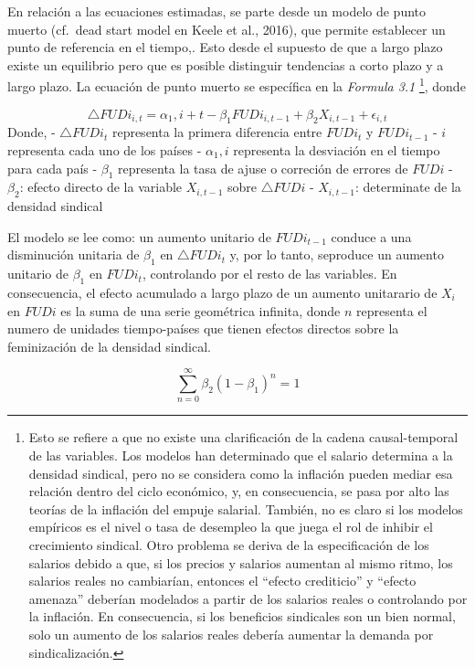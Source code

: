 \documentclass[
]{book}
\begin{document}
En relación a las ecuaciones estimadas, se parte desde un modelo de punto muerto (cf.~dead start model en Keele et al., 2016), que permite establecer un punto de referencia en el tiempo,. Esto desde el supuesto de que a largo plazo existe un equilibrio pero que es posible distinguir tendencias a corto plazo y a largo plazo. La ecuación de punto muerto se específica en la \emph{Formula 3.1} \footnote{Esto se refiere a que no existe una clarificación de la cadena causal-temporal de las variables. Los modelos han determinado que el salario determina a la densidad sindical, pero no se considera como la inflación pueden mediar esa relación dentro del ciclo económico, y, en consecuencia, se pasa por alto las teorías de la inflación del empuje salarial. También, no es claro si los modelos empíricos es el nivel o tasa de desempleo la que juega el rol de inhibir el crecimiento sindical. Otro problema se deriva de la especificación de los salarios debido a que, si los precios y salarios aumentan al mismo ritmo, los salarios reales no cambiarían, entonces el ``efecto crediticio'' y ``efecto amenaza'' deberían modelados a partir de los salarios reales o controlando por la inflación. En consecuencia, si los beneficios sindicales son un bien normal, solo un aumento de los salarios reales debería aumentar la demanda por sindicalización.}, donde

\[\triangle FUDi_{i,t} = \alpha_1,i + t- \beta_1FUDi_{i,t-1}+ \beta_2X_{i,t-1}+ \epsilon_{i,t}\]
Donde,
- \(\triangle FUDi_{t}\) representa la primera diferencia entre \(FUDi_{t}\) y \(FUDi_{t-1}\)
- \(i\) representa cada uno de los países
- \(\alpha_1,i\) representa la desviación en el tiempo para cada país
- \(\beta_1\) representa la tasa de ajuse o correción de errores de \(FUDi\)
- \(\beta_2\): efecto directo de la variable \(X_{i,t-1}\) sobre \(\triangle FUDi\)
- \(X_{i,t-1}\): determinate de la densidad sindical

El modelo se lee como: un aumento unitario de \(FUDi_{t-1}\) conduce a una disminución unitaria de \(\beta_1\) en \(\triangle FUDi_{t}\) y, por lo tanto, seproduce un aumento unitario de \(\beta_1\) en \(FUDi_{t}\), controlando por el resto de las variables. En consecuencia, el efecto acumulado a largo plazo de un aumento unitarario de \(X_{i}\) en \(FUDi\) es la suma de una serie geométrica infinita, donde \(n\) representa el numero de unidades tiempo-países que tienen efectos directos sobre la feminización de la densidad sindical.

\[\sum_{n=0}^{\infty} \beta_2(1-\beta_1)^{n} = 1\]
\end{document}
